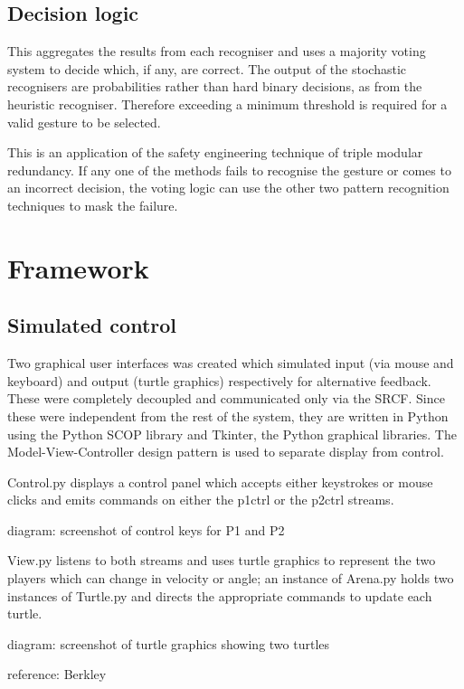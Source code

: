 \documentclass[12pt,a4,notitlepage]{report}
\renewcommand{\_}{\texttt{\symbol{95}}}
\newcommand{\<}{\texttt{\symbol{60}}}
\renewcommand{\>}{\texttt{\symbol{62}}}
\begin{document}
\subsection{Decision logic}

This aggregates the results from each recogniser and uses a majority voting system to decide which, if any, are correct. The output of the stochastic recognisers are probabilities rather than hard binary decisions, as from the heuristic recogniser. Therefore exceeding a minimum threshold is required for a valid gesture to be selected.

This is an application of the safety engineering technique of triple modular redundancy. If any one of the methods fails to recognise the gesture or comes to an incorrect decision, the voting logic can use the other two pattern recognition techniques to mask the failure.

\section{Framework}

\subsection{Simulated control}

Two graphical user interfaces was created which simulated input (via mouse and keyboard) and output (turtle graphics) respectively for alternative feedback. These were completely decoupled and communicated only via the SRCF. Since these were independent from the rest of the system, they are written in Python using the Python SCOP library and Tkinter, the Python graphical libraries. The Model-View-Controller design pattern is used to separate display from control.

Control.py displays a control panel which accepts either keystrokes or mouse clicks and emits commands on either the p1ctrl or the p2ctrl streams.

{diagram: screenshot of control keys for P1 and P2}

View.py listens to both streams and uses turtle graphics to represent the two players which can change in velocity or angle; an instance of Arena.py holds two instances of Turtle.py and directs the appropriate commands to update each turtle.

{diagram: screenshot of turtle graphics showing two turtles}

{reference: Berkley}
\end{document}
